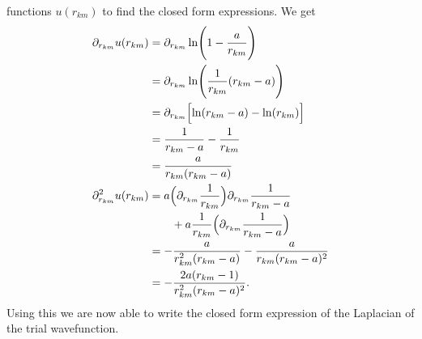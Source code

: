\documentclass[
    a4paper, aps, twocolumn, floatfix, superscriptaddress]{revtex4-1}
\newcommand{\1}{\mathds{1}}
\begin{document}
            functions $u(r_{km})$ to find the closed form expressions. We get
            \begin{align}
                \partial_{r_{km}}u(r_{km})
                &=
                \partial_{r_{km}}
                \ln\Biggl(
                    1 - \frac{a}{r_{km}}
                \Biggr) \\
                &=
                \partial_{r_{km}}
                \ln\Biggl(
                    \frac{1}{r_{km}}
                    (r_{km} - a)
                \Biggr) \\
                &=
                \partial_{r_{km}}
                \Bigl[
                    \ln(r_{km} - a)
                    - \ln(r_{km})
                \Bigr] \\
                &=
                \frac{1}{r_{km} - a} - \frac{1}{r_{km}} \\
                &=
                \frac{a}{r_{km}(r_{km} - a)} \\
                \partial_{r_{km}}^2u(r_{km})
                &= a\Bigl(
                    \partial_{r_{km}}\frac{1}{r_{km}}
                \Bigr)
                \partial_{r_{km}}\frac{1}{r_{km} - a}
                \nonumber \\
                &\qquad
                + a\frac{1}{r_{km}}
                \Bigl(
                    \partial_{r_{km}}\frac{1}{r_{km} - a}
                \Bigr) \\
                &=
                -\frac{a}{r_{km}^2(r_{km} - a)}
                -\frac{a}{r_{km}(r_{km} - a)^2} \\
                &=
                - \frac{2a(r_{km} - 1)}{r_{km}^2(r_{km} - a)^2}.
            \end{align}
            Using this we are now able to write the closed form expression of
            the Laplacian of the trial wavefunction.
\end{document}

